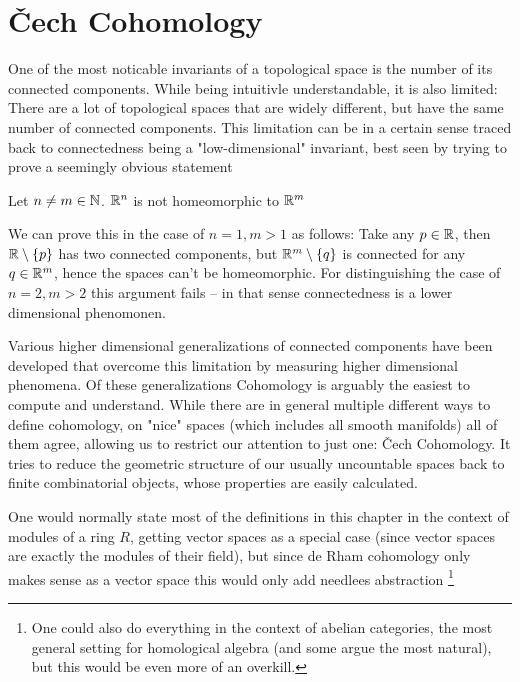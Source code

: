 \chapter{Čech Cohomology}
One of the most noticable invariants of a topological space is the number of its connected components.
While being intuitivle understandable, it is also limited: There are a lot of topological spaces that are
widely different, but have the same number of connected components. This limitation can be in a certain sense
traced back to connectedness being a "low-dimensional" invariant, best seen by trying to prove a seemingly obvious statement
\begin{theorem}
	Let $n \neq m \in \mathbb{N}$. $\mathbb{R}^n$ is not homeomorphic to $\mathbb{R}^m$
\end{theorem}
We can prove this in the case of $n = 1, m > 1$ as follows: Take any $p \in \mathbb{R}$, then $\mathbb{R} \setminus \{p\}$ has
two connected components, but $\mathbb{R}^m \setminus \{q\}$ is connected for any $q \in \mathbb{R}^m$, hence the spaces can't
be homeomorphic. For distinguishing the case of $n = 2, m > 2$ this argument fails – in that sense connectedness
is a lower dimensional phenomonen.

Various higher dimensional generalizations of connected components have been developed
that overcome this limitation by measuring higher dimensional phenomena. Of these generalizations
Cohomology is arguably the easiest to compute and understand. While there are in general multiple different
ways to define cohomology, on "nice" spaces (which includes all smooth manifolds) all of them agree, allowing
us to restrict our attention to just one: Čech Cohomology. It tries to reduce the geometric structure of our
usually uncountable spaces back to finite combinatorial objects, whose properties are easily calculated.

\begin{remark}
One would normally state most of the definitions in this chapter in
the context of modules of a ring $R$, getting vector spaces as a special
case (since vector spaces are exactly the modules of their field),
but since de Rham cohomology only makes sense as a vector space this
would only add needlees abstraction \footnote{
	One could also do everything in the context of abelian categories,
	the most general setting for homological algebra
	(and some argue the most natural), but this would be even more of an
	overkill.
}
\end{remark}

